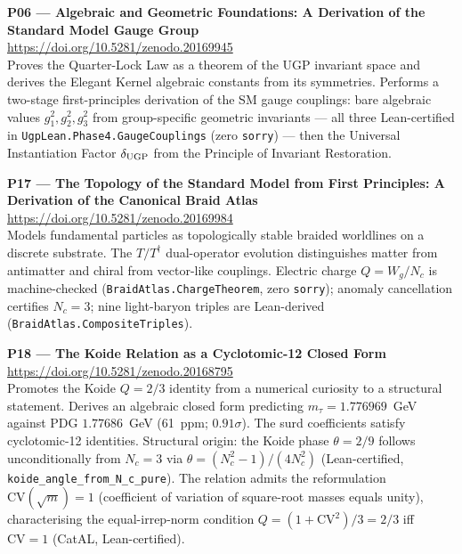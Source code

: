 \documentclass[11pt]{article}
\begin{document}
\medskip
\noindent\textbf{P06 — Algebraic and Geometric Foundations: A Derivation of
the Standard Model Gauge Group}~\cite{SpivackUGPMath}\\
\url{https://doi.org/10.5281/zenodo.20169945}\\
Proves the Quarter-Lock Law as a theorem of the UGP invariant space and
derives the Elegant Kernel algebraic constants from its symmetries.
Performs a two-stage first-principles derivation of the SM gauge couplings:
bare algebraic values $g_1^2, g_2^2, g_3^2$ from group-specific geometric
invariants --- all three Lean-certified in \texttt{UgpLean.Phase4.GaugeCouplings}
(zero \texttt{sorry}) --- then the Universal Instantiation Factor $\delta_{\rm UGP}$
from the Principle of Invariant Restoration.

\medskip
\noindent\textbf{P17 — The Topology of the Standard Model from First Principles:
A Derivation of the Canonical Braid Atlas}~\cite{SpivackBraidAtlas}\\
\url{https://doi.org/10.5281/zenodo.20169984}\\
Models fundamental particles as topologically stable braided worldlines on a
discrete substrate.  The $T/T^\dagger$ dual-operator evolution distinguishes
matter from antimatter and chiral from vector-like couplings.  Electric charge
$Q = W_g/N_c$ is machine-checked (\texttt{BraidAtlas.ChargeTheorem}, zero
\texttt{sorry}); anomaly cancellation certifies $N_c = 3$; nine light-baryon
triples are Lean-derived (\texttt{BraidAtlas.CompositeTriples}).

\medskip
\noindent\textbf{P18 — The Koide Relation as a Cyclotomic-12 Closed Form}~\cite{Spivack2026_Koide}\\
\url{https://doi.org/10.5281/zenodo.20168795}\\
Promotes the Koide $Q = 2/3$ identity from a numerical curiosity to a
structural statement.  Derives an algebraic closed form predicting
$m_\tau = 1.776969$~GeV against PDG $1.77686$~GeV (61~ppm; $0.91\sigma$).
The surd coefficients satisfy cyclotomic-12 identities.  Structural origin:
the Koide phase $\theta = 2/9$ follows unconditionally from $N_c = 3$ via
$\theta = (N_c^2{-}1)/(4N_c^2)$ (Lean-certified, \texttt{koide\_angle\_from\_N\_c\_pure}).
The relation admits the reformulation $\mathrm{CV}(\sqrt{m}) = 1$ (coefficient of
variation of square-root masses equals unity), characterising the equal-irrep-norm
condition $Q = (1 + \mathrm{CV}^2)/3 = 2/3$ iff $\mathrm{CV} = 1$ (CatAL, Lean-certified).
\end{document}

